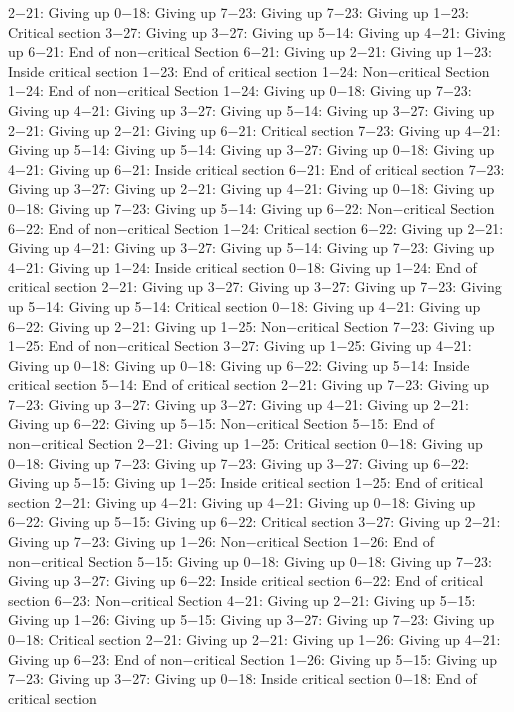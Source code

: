 2−21: Giving up
0−18: Giving up
7−23: Giving up
7−23: Giving up
1−23: Critical section
3−27: Giving up
3−27: Giving up
5−14: Giving up
4−21: Giving up
6−21: End of non−critical Section
6−21: Giving up
2−21: Giving up
1−23: Inside critical section
1−23: End of critical section
1−24: Non−critical Section
1−24: End of non−critical Section
1−24: Giving up
0−18: Giving up
7−23: Giving up
4−21: Giving up
3−27: Giving up
5−14: Giving up
3−27: Giving up
2−21: Giving up
2−21: Giving up
6−21: Critical section
7−23: Giving up
4−21: Giving up
5−14: Giving up
5−14: Giving up
3−27: Giving up
0−18: Giving up
4−21: Giving up
6−21: Inside critical section
6−21: End of critical section
7−23: Giving up
3−27: Giving up
2−21: Giving up
4−21: Giving up
0−18: Giving up
0−18: Giving up
7−23: Giving up
5−14: Giving up
6−22: Non−critical Section
6−22: End of non−critical Section
1−24: Critical section
6−22: Giving up
2−21: Giving up
4−21: Giving up
3−27: Giving up
5−14: Giving up
7−23: Giving up
4−21: Giving up
1−24: Inside critical section
0−18: Giving up
1−24: End of critical section
2−21: Giving up
3−27: Giving up
3−27: Giving up
7−23: Giving up
5−14: Giving up
5−14: Critical section
0−18: Giving up
4−21: Giving up
6−22: Giving up
2−21: Giving up
1−25: Non−critical Section
7−23: Giving up
1−25: End of non−critical Section
3−27: Giving up
1−25: Giving up
4−21: Giving up
0−18: Giving up
0−18: Giving up
6−22: Giving up
5−14: Inside critical section
5−14: End of critical section
2−21: Giving up
7−23: Giving up
7−23: Giving up
3−27: Giving up
3−27: Giving up
4−21: Giving up
2−21: Giving up
6−22: Giving up
5−15: Non−critical Section
5−15: End of non−critical Section
2−21: Giving up
1−25: Critical section
0−18: Giving up
0−18: Giving up
7−23: Giving up
7−23: Giving up
3−27: Giving up
6−22: Giving up
5−15: Giving up
1−25: Inside critical section
1−25: End of critical section
2−21: Giving up
4−21: Giving up
4−21: Giving up
0−18: Giving up
6−22: Giving up
5−15: Giving up
6−22: Critical section
3−27: Giving up
2−21: Giving up
7−23: Giving up
1−26: Non−critical Section
1−26: End of non−critical Section
5−15: Giving up
0−18: Giving up
0−18: Giving up
7−23: Giving up
3−27: Giving up
6−22: Inside critical section
6−22: End of critical section
6−23: Non−critical Section
4−21: Giving up
2−21: Giving up
5−15: Giving up
1−26: Giving up
5−15: Giving up
3−27: Giving up
7−23: Giving up
0−18: Critical section
2−21: Giving up
2−21: Giving up
1−26: Giving up
4−21: Giving up
6−23: End of non−critical Section
1−26: Giving up
5−15: Giving up
7−23: Giving up
3−27: Giving up
0−18: Inside critical section
0−18: End of critical section
